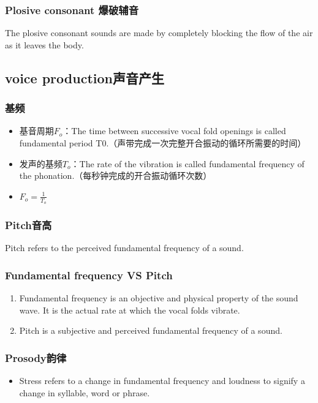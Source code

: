 \documentclass[UTF8]{ctexart}
\begin{document}
\subsubsection{Plosive consonant 爆破辅音}
The plosive consonant sounds are made by completely blocking the flow of the air as it leaves the body.

\subsection{voice production声音产生}

\subsubsection{基频}
\begin{itemize}
    \item 基音周期$F_o$：The time between successive vocal fold openings is called fundamental period T0.（声带完成一次完整开合振动的循环所需要的时间）
    \item 发声的基频$T_o$：The rate of the vibration is called fundamental frequency of the phonation.（每秒钟完成的开合振动循环次数）
    \item $F_o=\frac{1}{T_o}$
\end{itemize}

\subsubsection{Pitch音高}
Pitch refers to the perceived fundamental frequency of a sound.

\subsubsection{Fundamental frequency VS Pitch}
\begin{enumerate}
    \item Fundamental frequency is an objective and physical property of the sound wave. It is the actual rate at which the vocal folds vibrate.
    \item Pitch is a subjective and perceived fundamental frequency of a sound.
\end{enumerate}

\subsubsection{Prosody韵律}
\begin{itemize}
    \item Stress refers to a change in fundamental frequency and loudness to signify a change in syllable, word or phrase. 
\end{itemize}
\end{document}
